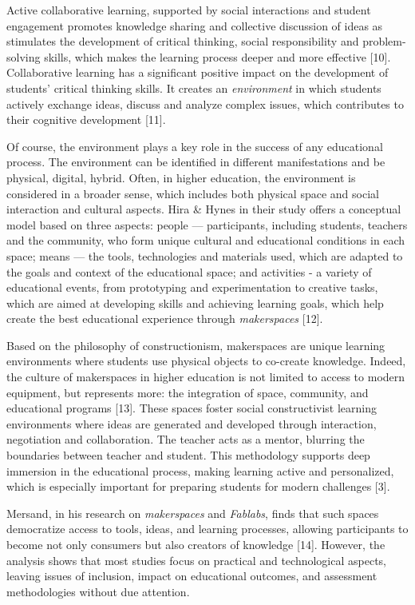 \begin{multicols}{2}
Active collaborative learning, supported by social interactions and
student engagement promotes knowledge sharing and collective discussion
of ideas as stimulates the development of critical thinking, social
responsibility and problem-solving skills, which makes the learning
process deeper and more effective {[}10{]}. Collaborative learning has a
significant positive impact on the development of
students'{} critical thinking skills. It creates an
\emph{environment} in which students actively exchange ideas, discuss
and analyze complex issues, which contributes to their cognitive
development {[}11{]}.

Of course, the environment plays a key role in the success of any
educational process. The environment can be identified in different
manifestations and be physical, digital, hybrid. Often, in higher
education, the environment is considered in a broader sense, which
includes both physical space and social interaction and cultural
aspects. Hira \& Hynes in their study offers a conceptual model based on
three aspects: people --- participants, including students, teachers and
the community, who form unique cultural and educational conditions in
each space; means --- the tools, technologies and materials used, which
are adapted to the goals and context of the educational space; and
activities - a variety of educational events, from prototyping and
experimentation to creative tasks, which are aimed at developing skills
and achieving learning goals, which help create the best educational
experience through \emph{makerspaces} {[}12{]}.

Based on the philosophy of constructionism, makerspaces are unique
learning environments where students use physical objects to co-create
knowledge. Indeed, the culture of makerspaces in higher education is not
limited to access to modern equipment, but represents more: the
integration of space, community, and educational programs {[}13{]}.
These spaces foster social constructivist learning environments where
ideas are generated and developed through interaction, negotiation and
collaboration. The teacher acts as a mentor, blurring the boundaries
between teacher and student. This methodology supports deep immersion in
the educational process, making learning active and personalized, which
is especially important for preparing students for modern challenges
{[}3{]}.\hspace{0pt}

Mersand, in his research on \emph{makerspaces} and \emph{Fablabs}, finds
that such spaces democratize access to tools, ideas, and learning
processes, allowing participants to become not only consumers but also
creators of knowledge {[}14{]}. However, the analysis shows that most
studies focus on practical and technological aspects, leaving issues of
inclusion, impact on educational outcomes, and assessment methodologies
without due attention.


\end{multicols}
